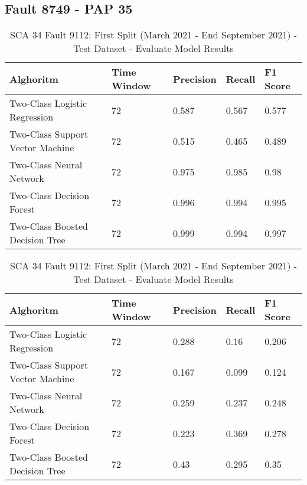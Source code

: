 \subsection{Fault 8749 - PAP 35}

\begin{table}[!ht]
    \centering
    \begin{tabular}{|l|l|l|l|l|}
    \hline
        Alghoritm & Time Window & Precision & Recall & F1 Score \\ \hline
        Two-Class Logistic Regression & 72 & 0.587 & 0.567 & 0.577 \\ \hline
        Two-Class Support Vector Machine & 72 & 0.515 & 0.465 & 0.489 \\ \hline
        Two-Class Neural Network & 72 & 0.975 & 0.985 & 0.98 \\ \hline
        Two-Class Decision Forest & 72 & 0.996 & 0.994 & 0.995 \\ \hline
        Two-Class Boosted Decision Tree & 72 & 0.999 & 0.994 & 0.997 \\ \hline
    \end{tabular}
    \caption{SCA 34 Fault 9112: First Split (March 2021 - End September 2021) - Test Dataset - Evaluate Model Results}
    \label{9112_SCA34_1st}
\end{table}

\begin{table}[!ht]
    \centering
    \begin{tabular}{|l|l|l|l|l|}
    \hline
        Alghoritm & Time Window & Precision & Recall & F1 Score \\ \hline
        Two-Class Logistic Regression & 72 & 0.288 & 0.16 & 0.206 \\ \hline
        Two-Class Support Vector Machine & 72 & 0.167 & 0.099 & 0.124 \\ \hline
        Two-Class Neural Network & 72 & 0.259 & 0.237 & 0.248 \\ \hline
        Two-Class Decision Forest & 72 & 0.223 & 0.369 & 0.278 \\ \hline
        Two-Class Boosted Decision Tree & 72 & 0.43 & 0.295 & 0.35 \\ \hline
    \end{tabular}
    \caption{SCA 34 Fault 9112: First Split (March 2021 - End September 2021) - Test Dataset - Evaluate Model Results}
    \label{9112_SCA34_1st}
\end{table}

